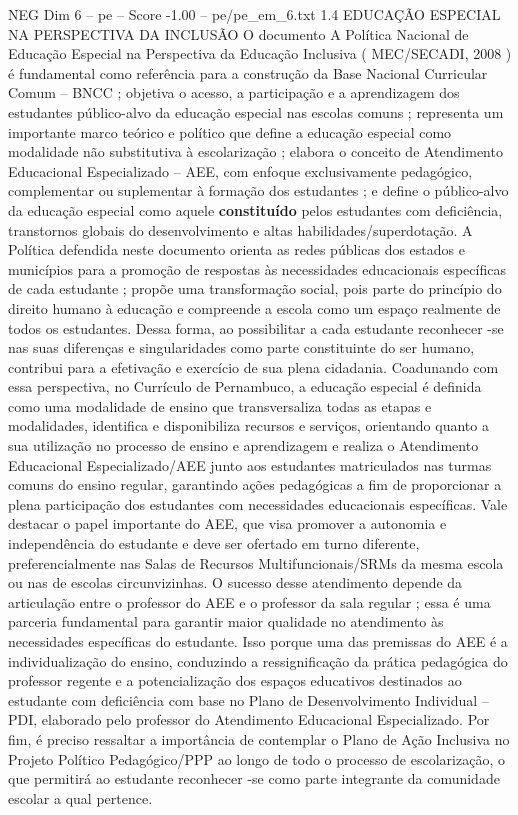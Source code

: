 \begin{textsample}{NEG Dim 6 – pe – Score -1.00 – pe/pe\_em\_6.txt}  \label{ex:f6_neg_031}
1.4 EDUCAÇÃO ESPECIAL NA PERSPECTIVA DA INCLUSÃO O documento A Política Nacional de Educação Especial na Perspectiva da Educação Inclusiva ( MEC/SECADI, 2008 ) é fundamental como referência para a construção da Base Nacional Curricular Comum – BNCC ; objetiva o acesso, a participação e a aprendizagem dos estudantes público-alvo da educação especial nas escolas comuns ; representa um importante marco teórico e político que define a educação especial como modalidade não substitutiva à escolarização ; elabora o conceito de Atendimento Educacional Especializado – AEE, com enfoque exclusivamente pedagógico, complementar ou suplementar à formação dos estudantes ; e define o público-alvo da educação especial como aquele \textbf{constituído} pelos estudantes com deficiência, transtornos globais do desenvolvimento e altas habilidades/superdotação.
A Política defendida neste documento orienta as redes públicas dos estados e municípios para a promoção de respostas às necessidades educacionais específicas de cada estudante ; propõe uma transformação social, pois parte do princípio do direito humano à educação e compreende a escola como um espaço realmente de todos os estudantes.
Dessa forma, ao possibilitar a cada estudante reconhecer -se nas suas diferenças e singularidades como parte constituinte do ser humano, contribui para a efetivação e exercício de sua plena cidadania.
Coadunando com essa perspectiva, no Currículo de Pernambuco, a educação especial é definida como uma modalidade de ensino que transversaliza todas as etapas e modalidades, identifica e disponibiliza recursos e serviços, orientando quanto a sua utilização no processo de ensino e aprendizagem e realiza o Atendimento Educacional Especializado/AEE junto aos estudantes matriculados nas turmas comuns do ensino regular, garantindo ações pedagógicas a fim de proporcionar a plena participação dos estudantes com necessidades educacionais específicas.
Vale destacar o papel importante do AEE, que visa promover a autonomia e independência do estudante e deve ser ofertado em turno diferente, preferencialmente nas Salas de Recursos Multifuncionais/SRMs da mesma escola ou nas de escolas circunvizinhas.
O sucesso desse atendimento depende da articulação entre o professor do AEE e o professor da sala regular ; essa é uma parceria fundamental para garantir maior qualidade no atendimento às necessidades específicas do estudante.
Isso porque uma das premissas do AEE é a individualização do ensino, conduzindo a ressignificação da prática pedagógica do professor regente e a potencialização dos espaços educativos destinados ao estudante com deficiência com base no Plano de Desenvolvimento Individual – PDI, elaborado pelo professor do Atendimento Educacional Especializado.
Por fim, é preciso ressaltar a importância de contemplar o Plano de Ação Inclusiva no Projeto Político Pedagógico/PPP ao longo de todo o processo de escolarização, o que permitirá ao estudante reconhecer -se como parte integrante da comunidade escolar a qual pertence.

\end{textsample}
